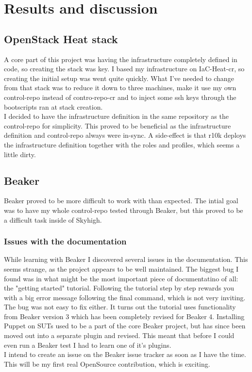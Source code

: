 
\section{Results and discussion}

\subsection{OpenStack Heat stack}

A core part of this project was having the infrastructure completely defined in code, so creating the stack was key. I based my infrastructure on IaC-Heat-cr, so creating the initial setup was went quite quickly. What I've needed to change from that stack was to reduce it down to three machines, make it use my own control-repo instead of contro-repo-cr and to inject some ssh keys through the bootscripts ran at stack creation.
\\
I decided to have the infrastructure definition in the same repository as the control-repo for simplicity. This proved to be beneficial as the infrastructure definition and control-repo always were in-sync. A side-effect is that r10k deploys the infrastructure definition together with the roles and profiles, which seems a little dirty. 

\subsection{Beaker}

Beaker proved to be more difficult to work with than expected. The intial goal was to have my whole control-repo tested through Beaker, but this proved to be a difficult task inside of Skyhigh. 

\subsubsection{Issues with the documentation}

While learning with Beaker I discovered several issues in the documentation. This seems strange, as the project appears to be well maintained. The biggest bug I found was in what might be the most important piece of documentatino of all: the "getting started" tutorial. Following the tutorial step by step rewards you with a big error message following the final command, which is not very inviting. The bug was not easy to fix either. It turns out the tutorial uses functionality from Beaker version 3 which has been completely revised for Beaker 4. Installing Puppet on SUTs used to be a part of the core Beaker project, but has since been moved out into a separate plugin and revised. This meant that before I could even run a Beaker test I had to learn one of it's plugins.
\\
I intend to create an issue on the Beaker issue tracker as soon as I have the time. This will be my first real OpenSource contribution, which is exciting.

